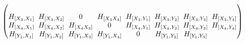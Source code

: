 \documentclass[11pt]{article}
\numberwithin{equation}{section}
\numberwithin{equation}{section}
\theoremstyle{definition}
\newcommand{\0}{\boldsymbol{0}}
\begin{document}
\begin{gather*}
\begin{pmatrix}
\\
H_{[X_3, X_1]} \hspace{-2.3pt}&\hspace{-2.3pt} H_{[X_3, X_2]} \hspace{-2.3pt}&\hspace{-2.3pt} 0 \hspace{-2.3pt}&\hspace{-2.3pt} H_{[X_3 X_4]} \hspace{-2.3pt}&\hspace{-2.3pt} H_{[X_3, Y_1]} \hspace{-2.3pt}&\hspace{-2.3pt} H_{[X_3, Y_2]} \hspace{-2.3pt}&\hspace{-2.3pt} H_{[X_3, Y_3]} \hspace{-2.3pt}&\hspace{-2.3pt}
H_{[X_3, Y_4]}
\\
H_{[X_4, X_1]} \hspace{-2.3pt}&\hspace{-2.3pt} H_{[X_4, X_2]} \hspace{-2.3pt}&\hspace{-2.3pt} H_{[X_4 X_3]} \hspace{-2.3pt}&\hspace{-2.3pt} 0 \hspace{-2.3pt}&\hspace{-2.3pt} H_{[X_4, Y_1]} \hspace{-2.3pt}&\hspace{-2.3pt} H_{[X_4, Y_2]} \hspace{-2.3pt}&\hspace{-2.3pt} H_{[X_4, Y_3]} \hspace{-2.3pt}&\hspace{-2.3pt}
H_{[X_4, Y_4]}
\\
H_{[Y_1, X_1]} \hspace{-2.3pt}&\hspace{-2.3pt} H_{[Y_1, X_2]} \hspace{-2.3pt}&\hspace{-2.3pt} H_{[Y_1, X_3]} \hspace{-2.3pt}&\hspace{-2.3pt} H_{[Y_1, X_4]} \hspace{-2.3pt}&\hspace{-2.3pt} 0 \hspace{-2.3pt}&\hspace{-2.3pt} H_{[Y_1, Y_2]} \hspace{-2.3pt}&\hspace{-2.3pt} H_{[Y_1, Y_3]} \hspace{-2.3pt}&\hspace{-2.3pt}

\end{pmatrix}
\end{gather*}
\end{document}
